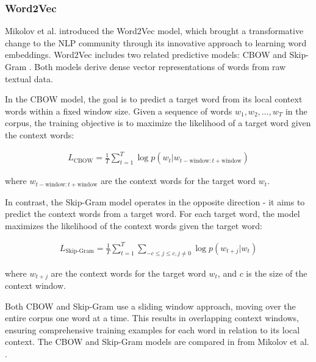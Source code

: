 \subsubsection*{Word2Vec}

Mikolov et al. \cite{MikolovEfficientEstimation2013} introduced the Word2Vec model, which brought a transformative change to the \ac{NLP} community through its innovative approach to learning word embeddings. Word2Vec includes two related predictive models: \ac{CBOW} and Skip-Gram \cite{McCormickWord2VecTutorial2016,AlammarIllustratedWord2vec2019}. Both models derive dense vector representations of words from raw textual data.

In the \ac{CBOW} model, the goal is to predict a target word from its local context words within a fixed window size. Given a sequence of words $w_1, w_2, \dots, w_T$ in the corpus, the training objective is to maximize the likelihood of a target word given the context words:

\begin{align}
    L_{\text{CBOW}} = \frac{1}{T} \sum_{t=1}^{T} \log p(w_t | w_{t - \text{window} : t + \text{window}}) \label{eq:cbow}
\end{align}

where $w_{t - \text{window} : t + \text{window}}$ are the context words for the target word $w_t$.

In contrast, the Skip-Gram model operates in the opposite direction - it aims to predict the context words from a target word. For each target word, the model maximizes the likelihood of the context words given the target word:

\begin{align}
    L_{\text{Skip-Gram}} = \frac{1}{T} \sum_{t=1}^{T} \sum_{-c \leq j \leq c, j \neq 0} \log p(w_{t+j} | w_t) \label{eq:skip-gram}
\end{align}

where $w_{t+j}$ are the context words for the target word $w_t$, and $c$ is the size of the context window.

Both \ac{CBOW} and Skip-Gram use a sliding window approach, moving over the entire corpus one word at a time. This results in overlapping context windows, ensuring comprehensive training examples for each word in relation to its local context.
The \ac{CBOW} and Skip-Gram models are compared in  from Mikolov et al. \cite{MikolovEfficientEstimation2013}.

